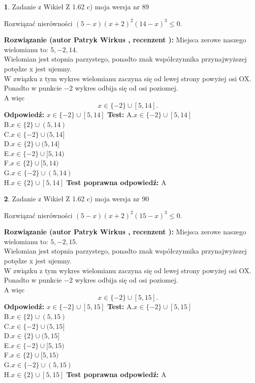\documentclass[12pt, a4paper]{article}
\theoremstyle{definition} %
\newtheorem{zad}{}
\newcommand{\zadStart}[1]{\begin{zad}#1\newline}
\newcommand{\zadStop}{\end{zad}}
\newcommand{\rozwStart}[2]{\noindent \textbf{Rozwiązanie (autor #1 , recenzent #2): }\newline}
\newcommand{\rozwStop}{\newline}
\newcommand{\odpStart}{\noindent \textbf{Odpowiedź:}\newline}
\newcommand{\odpStop}{\newline}
\newcommand{\testStart}{\noindent \textbf{Test:}\newline}
\newcommand{\testStop}{\newline}
\newcommand{\kluczStart}{\noindent \textbf{Test poprawna odpowiedź:}\newline}
\newcommand{\kluczStop}{\newline}
\begin{document}
\zadStart{Zadanie z Wikieł Z 1.62 c) moja wersja nr 89}

Rozwiązać nierówności $(5-x)(x+2)^{2}(14-x)^{3}\le0$.
\zadStop
\rozwStart{Patryk Wirkus}{}
Miejsca zerowe naszego wielomianu to: $5, -2, 14$.\\
Wielomian jest stopnia parzystego, ponadto znak współczynnika przy\linebreak najwyższej potędze x jest ujemny.\\ W związku z tym wykres wielomianu zaczyna się od lewej strony powyżej osi OX.\\
Ponadto w punkcie $-2$ wykres odbija się od osi poziomej.\\
A więc $$x \in \{-2\} \cup [5,14].$$
\rozwStop
\odpStart
$x \in \{-2\} \cup [5,14]$
\odpStop
\testStart
A.$x \in \{-2\} \cup [5,14]$\\
B.$x \in \{2\} \cup (5,14)$\\
C.$x \in \{-2\} \cup (5,14]$\\
D.$x \in \{2\} \cup (5,14]$\\
E.$x \in \{-2\} \cup [5,14)$\\
F.$x \in \{2\} \cup [5,14)$\\
G.$x \in \{-2\} \cup (5,14)$\\
H.$x \in \{2\} \cup [5,14]$
\testStop
\kluczStart
A
\kluczStop



\zadStart{Zadanie z Wikieł Z 1.62 c) moja wersja nr 90}

Rozwiązać nierówności $(5-x)(x+2)^{2}(15-x)^{3}\le0$.
\zadStop
\rozwStart{Patryk Wirkus}{}
Miejsca zerowe naszego wielomianu to: $5, -2, 15$.\\
Wielomian jest stopnia parzystego, ponadto znak współczynnika przy\linebreak najwyższej potędze x jest ujemny.\\ W związku z tym wykres wielomianu zaczyna się od lewej strony powyżej osi OX.\\
Ponadto w punkcie $-2$ wykres odbija się od osi poziomej.\\
A więc $$x \in \{-2\} \cup [5,15].$$
\rozwStop
\odpStart
$x \in \{-2\} \cup [5,15]$
\odpStop
\testStart
A.$x \in \{-2\} \cup [5,15]$\\
B.$x \in \{2\} \cup (5,15)$\\
C.$x \in \{-2\} \cup (5,15]$\\
D.$x \in \{2\} \cup (5,15]$\\
E.$x \in \{-2\} \cup [5,15)$\\
F.$x \in \{2\} \cup [5,15)$\\
G.$x \in \{-2\} \cup (5,15)$\\
H.$x \in \{2\} \cup [5,15]$
\testStop
\kluczStart
A
\kluczStop
\end{document}
